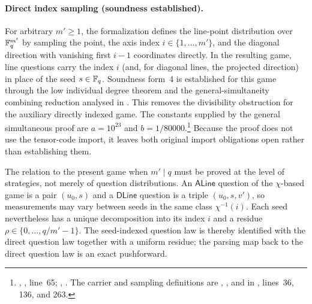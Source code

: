 \documentclass[11pt]{article}
\begin{document}
\paragraph{Direct index sampling (soundness established).}
For arbitrary $m' \ge 1$, the formalization defines the line-point
distribution over $\mathbb{F}_q^{m'}$ by sampling the point, the axis index
$i \in \{1,\ldots,m'\}$, and the diagonal direction with vanishing first
$i-1$ coordinates directly.  In the resulting game, line questions carry
the index $i$ (and, for diagonal lines, the projected direction) in place
of the seed $s \in \mathbb{F}_q$.  Soundness form~4 is established for this game
through the low individual degree theorem and the general-simultaneity
combining reduction analysed in \cite{gap:qpbt_ld-simultaneous-sandwich}.
This removes the divisibility obstruction for the
auxiliary directly indexed game. The constants supplied by the general
simultaneous proof are $a=10^{23}$ and $b=1/80000$.\footnote{
,
, line~65;
,
.
The carrier and sampling definitions are ,
, and  in
,
lines~36, 136, and 263.}
Because the proof does not use the
tensor-code import, it leaves both original import obligations open rather
than establishing them.

The relation to the present game when $m' \mid q$ must be proved at the level
of strategies, not merely of question distributions.  An
$\mathsf{ALine}$ question of the $\chi$-based game is a pair $(u_0,s)$ and a
$\mathsf{DLine}$ question is a triple $(u_0,s,v')$, so measurements may vary
between seeds in the same class $\chi^{-1}(i)$.  Each seed nevertheless has a
unique decomposition into its index $i$ and a residue
$\rho\in\{0,\ldots,q/m'-1\}$.  The seed-indexed question law is thereby
identified with the direct question law together with a uniform residue; the
parsing map back to the direct question law is an exact pushforward.
\end{document}
